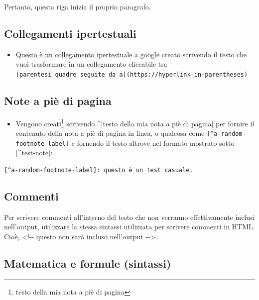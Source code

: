 \documentclass[a4paper, 11pt, nobind]{templates/ociamthesis}
\providecommand{\tightlist}{%
  \setlength{\itemsep}{0pt}\setlength{\parskip}{0pt}}
\begin{document}
Pertanto, questa riga inizia il proprio paragrafo.

\hypertarget{collegamenti-ipertestuali}{%
\subsection{Collegamenti ipertestuali}\label{collegamenti-ipertestuali}}

\begin{itemize}
\tightlist
\item
  \href{https://www.google.com}{Questo è un collegamento ipertestuale} a google creato scrivendo il testo che vuoi trasformare in un collegamento cliccabile tra \texttt{{[}parentesi\ quadre\ seguite\ da\ a{]}(https://hyperlink-in-parentheses)}
\end{itemize}

\hypertarget{note-a-piuxe8-di-pagina}{%
\subsection{Note a piè di pagina}\label{note-a-piuxe8-di-pagina}}

\begin{itemize}
\tightlist
\item
  Vengono creati\footnote{testo della mia nota a piè di pagina} scrivendo \^{}{[}testo della mia nota a piè di pagina{]} per fornire il contenuto della nota a piè di pagina in linea, o qualcosa come \texttt{{[}\^{}a-random-footnote-label{]}} e fornendo il testo altrove nel formato mostrato sotto {[}\^{}test-note{]}:
\end{itemize}

\texttt{{[}\^{}a-random-footnote-label{]}:\ questo\ è\ un\ test\ casuale.}

\hypertarget{commenti}{%
\subsection{Commenti}\label{commenti}}

Per scrivere commenti all'interno del testo che non verranno effettivamente inclusi nell'output, utilizzare la stessa sintassi utilizzata per scrivere commenti in HTML. Cioè, \textless!-\/- questo non sarà incluso nell'output -\/-\textgreater.

\hypertarget{matematica-e-formule-sintassi}{%
\subsection{Matematica e formule (sintassi)}\label{matematica-e-formule-sintassi}}
\end{document}
